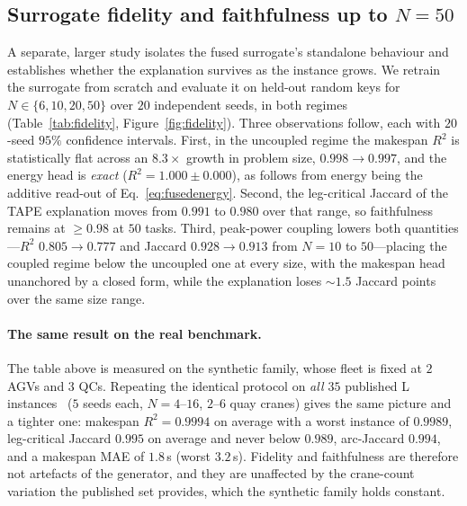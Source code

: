 \documentclass[11pt]{article}
\begin{document}
\subsection{Surrogate fidelity and faithfulness up to $N{=}50$}
\label{sec:fidelity}
A separate, larger study isolates the fused surrogate's standalone behaviour and establishes
whether the explanation survives as the instance grows. We
retrain the surrogate from scratch and evaluate it on held-out random keys for
$N\in\{6,10,20,50\}$ over $20$ independent seeds, in both regimes
(Table~\ref{tab:fidelity}, Figure~\ref{fig:fidelity}). Three observations follow, each with
$20$-seed $95\%$ confidence intervals. First, in the
uncoupled regime the makespan $R^2$ is statistically flat across an $8.3\times$ growth in
problem size, $0.998\!\to\!0.997$, and the energy head is \emph{exact}
($R^2=1.000\pm0.000$), as follows from energy being the additive read-out of
Eq.~\eqref{eq:fusedenergy}. Second, the leg-critical Jaccard of the TAPE explanation moves
from $0.991$ to $0.980$ over that range, so faithfulness remains at $\geq0.98$ at $50$
tasks. Third, peak-power coupling lowers both quantities---$R^2$ $0.805\!\to\!0.777$ and
Jaccard $0.928\!\to\!0.913$ from $N{=}10$ to $50$---placing the coupled regime below the
uncoupled one at every size, with the makespan head unanchored by a closed form, while the
explanation loses $\sim\!1.5$ Jaccard points over the same size range.

\paragraph{The same result on the real benchmark.} The table above is measured on the
synthetic family, whose fleet is fixed at $2$ AGVs and $3$ QCs. Repeating the identical
protocol on \emph{all $35$} published \textsf{L} instances~\cite{homayouni2022book}
($5$ seeds each, $N{=}4$--$16$, $2$--$6$ quay cranes) gives the same picture and a tighter
one: makespan $R^2 = 0.9994$ on average with a worst instance of $0.9989$, leg-critical
Jaccard $0.995$ on average and never below $0.989$, arc-Jaccard $0.994$, and a makespan MAE
of $1.8$\,s (worst $3.2$\,s). Fidelity and faithfulness are therefore not artefacts of the
generator, and they are unaffected by the crane-count variation the published set provides,
which the synthetic family holds constant.
\end{document}
